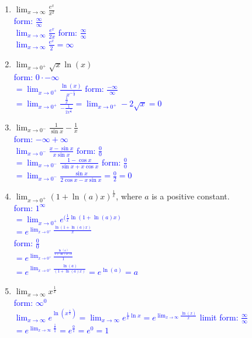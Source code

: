 \documentclass{ximera}
\begin{document}
\begin{exercise}
\begin{enumerate}
    \item $\displaystyle \lim_{x\rightarrow \infty} \frac{e^x}{x^2}$\\
    \textcolor{blue}{ form: $\frac{\infty}{\infty}$\\
    $\lim_{x\rightarrow \infty} \frac{e^x}{2x}$  form: $\frac{\infty}{\infty}$\\
    $\lim_{x\rightarrow \infty} \frac{e^x}{2}=\infty$}

    \item  $\displaystyle \lim_{x\rightarrow 0^+} \sqrt{x}\ln(x)$\\
     \textcolor{blue}{ form: $0\cdot -\infty$\\
    $=\lim_{x\rightarrow 0^+}\frac{\ln(x)}{x^{-\frac{1}{2}}}$ form: $\frac{-\infty}{\infty}$\\
    $=\lim_{x\rightarrow 0^+} \frac{\frac{1}{x}}{-\frac{1}{2x^{\frac{3}{2}}}}=\lim_{x\rightarrow 0^+} -2\sqrt{x}=0$}

    \item $\displaystyle \lim_{x\rightarrow 0^-} \frac{1}{\sin x}-\frac{1}{x}$\\
    \textcolor{blue}{ form: $-\infty+\infty$\\
    $\lim_{x\rightarrow 0^-} \frac{x-\sin x}{x\sin x}$ form: $\frac{0}{0}$\\
    $=\lim_{x\rightarrow 0^-} \frac{1-\cos x}{\sin x+x\cos x}$ form: $\frac{0}{0}$\\
    $=\lim_{x\rightarrow 0^-} \frac{\sin x}{2\cos x-x\sin x}=\frac{0}{2}=0$}

    \item $\displaystyle \lim_{x\rightarrow 0^+} (1+\ln(a)x)^{\frac{1}{x}}$, where $a$ is a positive constant.\\
    \textcolor{blue}{ form: $1^{\infty}$\\
    $=\lim_{x\rightarrow 0^+}e^{(\frac{1}{x}\ln(1+\ln(a)x)}$\\
    $=e^{\lim_{x\rightarrow 0^+}\frac{\ln(1+\ln(a)x)}{x}}$\\
    form: $\frac00$ \\
    $=e^{\lim_{x\rightarrow 0^+}\frac{\frac{\ln(a)}{1+\ln(a)x}}{1}}$\\
    $=e^{\lim_{x\rightarrow 0^+}\frac{\ln(a)}{(1+\ln(a)x)}}=e^{\ln(a)}=a$}

    \item $\displaystyle \lim_{x\rightarrow \infty} x^{\frac{1}{x}}$\\
    \textcolor{blue}{ form: $\infty^0$\\
    $\lim_{x\rightarrow \infty} e^{\ln(x^{\frac{1}{x}})}=\lim_{x\rightarrow \infty} e^{\frac{1}{x}\ln{x}}=e^{\lim_{x\rightarrow \infty} \frac{\ln(x)}{x}}$ limit form: $\frac{\infty}{\infty}$\\
    $=e^{\lim_{x\rightarrow \infty} \frac{\frac{1}{x}}{1}}=e^{\frac{0}{1}}=e^0=1$
    }
\end{enumerate}
\end{exercise}
\end{document}
